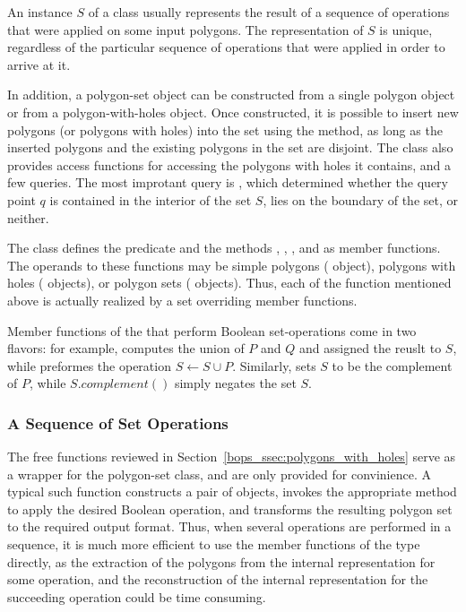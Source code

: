 An instance $S$ of a  class usually represents
the result of a sequence of operations that were applied on some input
polygons. The representation of $S$ is unique, regardless of the particular
sequence of operations that were applied in order to arrive at it.

In addition, a polygon-set object can be constructed from a single
polygon object or from a polygon-with-holes object. Once constructed,
it is possible to insert new polygons (or polygons with holes)
into the set using the  method, as long as the inserted
polygons and the existing polygons in the set are disjoint. 
The  class also provides access functions for
accessing the polygons with holes it contains, and a few queries. The
most improtant query is , which determined
whether the query point $q$ is contained in the interior of the set
$S$, lies on the boundary of the set, or neither.

The  class defines the predicate
 and the methods , ,
,  and  as member
functions. The operands to these functions may be simple polygons 
( object), polygons with holes
( objects), or polygon sets
( objects). Thus, each of the function
mentioned above is actually realized by a set overriding member
functions.

Member functions of the  that perform
Boolean set-operations come in two flavors: for example, 
computes the union of $P$ and $Q$ and assigned the reuslt to $S$, while
 preformes the operation $S \longleftarrow S \cup P$.
Similarly,  sets $S$ to be the complement of $P$,
while $S.complement()$ simply negates the set $S$.

\subsubsection{A Sequence of Set Operations}
\label{bops_sssec:sequence}

The free functions reviewed in Section~\ref{bops_ssec:polygons_with_holes}
serve as a wrapper for the polygon-set class, and are only provided for
convinience. A typical such function constructs a pair of
 objects, invokes the appropriate method to
apply the desired Boolean operation, and transforms the resulting
polygon set to the required output format. Thus, when several
operations are performed in a sequence, it is much more efficient to
use the member functions of the  type
directly, as the extraction of the polygons from the internal
representation for some operation, and the reconstruction of the
internal representation for the succeeding operation could be time
consuming.

